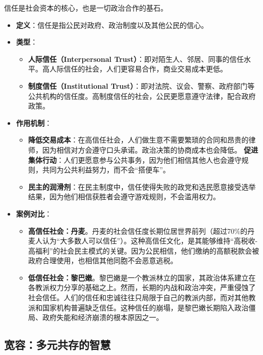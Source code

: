 信任是社会资本的核心，也是一切政治合作的基石。
\begin{itemize}
    \item \textbf{定义}：信任是指公民对政府、政治制度以及其他公民的信心。
    \item \textbf{类型}：
    \begin{itemize}
        \item \textbf{人际信任（Interpersonal Trust）}：即对陌生人、邻居、同事的信任水平。高人际信任的社会，人们更容易合作，商业交易成本更低。
        \item \textbf{制度信任（Institutional Trust）}：即对法院、议会、警察、政府部门等公共机构的信任度。高制度信任的社会，公民更愿意遵守法律，配合政府政策。
    \end{itemize}
    \item \textbf{作用机制}：
    \begin{itemize}
        \item \textbf{降低交易成本}：在高信任社会，人们做生意不需要繁琐的合同和昂贵的律师，因为相信对方会遵守口头承诺。政治决策的协商成本也会降低。
        \textbf{促进集体行动}：人们更愿意参与公共事务，因为他们相信其他人也会遵守规则，共同为公共利益努力，而不会“搭便车”。
        \item \textbf{民主的润滑剂}：在民主制度中，信任使得失败的政党和选民愿意接受选举结果，因为他们相信获胜者会遵守游戏规则，不会滥用权力。
    \end{itemize}
    \item \textbf{案例对比}：
    \begin{itemize}
        \item \textbf{高信任社会：丹麦}。丹麦的社会信任度长期位居世界前列（超过70\%的丹麦人认为“大多数人可以信任”）。这种高信任文化，是其能够维持“高税收-高福利”的社会民主模式的关键。因为公民相信，他们缴纳的高额税款会被政府合理使用，也相信其他同胞不会恶意逃税。
        \item \textbf{低信任社会：黎巴嫩}。黎巴嫩是一个教派林立的国家，其政治体系建立在各教派权力分享的基础之上。然而，长期的内战和政治冲突，严重侵蚀了社会信任。人们的信任和忠诚往往只局限于自己的教派内部，而对其他教派和国家机构普遍缺乏信任。这种信任的崩塌，是黎巴嫩长期陷入政治僵局、政府失能和经济崩溃的根本原因之一。
    \end{itemize}
\end{itemize}

\subsection{宽容：多元共存的智慧}

